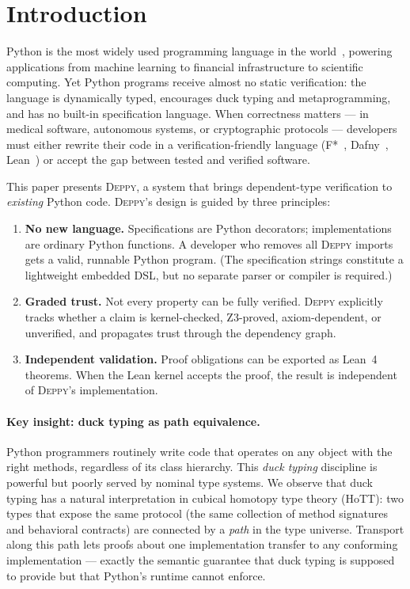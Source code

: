 \documentclass[acmsmall,nonacm,screen]{acmart}
\newcommand{\deppy}{\textsc{Deppy}}
\begin{document}

\section{Introduction}\label{sec:intro}

Python is the most widely used programming language in the
world~\cite{tiobe2024}, powering applications from machine learning to
financial infrastructure to scientific computing.  Yet Python programs
receive almost no static verification: the language is dynamically
typed, encourages duck typing and metaprogramming, and has no built-in
specification language.  When correctness matters --- in medical
software, autonomous systems, or cryptographic protocols --- developers
must either rewrite their code in a verification-friendly language
(F*~\cite{fstar}, Dafny~\cite{dafny}, Lean~\cite{lean4}) or accept
the gap between tested and verified software.

This paper presents \deppy{}, a system that brings dependent-type
verification to \emph{existing} Python code.  \deppy{}'s design is
guided by three principles:

\begin{enumerate}
\item \textbf{No new language.}  Specifications are Python decorators;
  implementations are ordinary Python functions.  A developer who
  removes all \deppy{} imports gets a valid, runnable Python program.
  (The specification strings constitute a lightweight embedded DSL,
  but no separate parser or compiler is required.)
\item \textbf{Graded trust.}  Not every property can be fully verified.
  \deppy{} explicitly tracks whether a claim is kernel-checked,
  Z3-proved, axiom-dependent, or unverified, and propagates trust
  through the dependency graph.
\item \textbf{Independent validation.}  Proof obligations can be
  exported as Lean~4 theorems.  When the Lean kernel accepts the
  proof, the result is independent of \deppy{}'s implementation.
\end{enumerate}

\paragraph{Key insight: duck typing as path equivalence.}
Python programmers routinely write code that operates on any object
with the right methods, regardless of its class hierarchy.  This
\emph{duck typing} discipline is powerful but poorly served by nominal
type systems.  We observe that duck typing has a natural interpretation
in cubical homotopy type theory (HoTT): two types that expose the same
protocol (the same collection of method signatures and behavioral
contracts) are connected by a \emph{path} in the type universe.
Transport along this path lets proofs about one implementation transfer
to any conforming implementation --- exactly the semantic guarantee that
duck typing is supposed to provide but that Python's runtime cannot
enforce.
\end{document}
